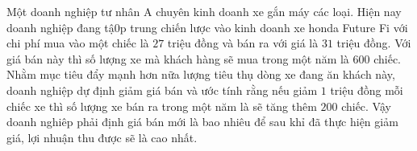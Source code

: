 \begin{bt}%
	Một doanh nghiệp tư nhân A chuyên kinh doanh xe gắn máy các loại. Hiện nay doanh nghiệp đang tậ0p trung chiến lược vào kinh doanh xe honda Future Fi với chi phí mua vào một chiếc là $27$ triệu đồng và bán ra với giá là $31$ triệu đồng. Với giá bán này thì số lượng xe mà khách hàng sẽ mua trong một năm là $600$ chiếc. Nhằm mục tiêu đẩy mạnh hơn nữa lượng tiêu thụ dòng xe đang ăn khách này, doanh nghiệp dự định giảm giá bán và ước tính rằng nếu giảm $1$ triệu đồng mỗi chiếc xe thì số lượng xe bán ra trong một năm là sẽ tăng thêm $200$ chiếc. Vậy doanh nghiêp phải định giá bán mới là bao nhiêu để sau khỉ đã thực hiện giảm giá, lợi nhuận thu được sẽ là cao nhất.
\end{bt}

